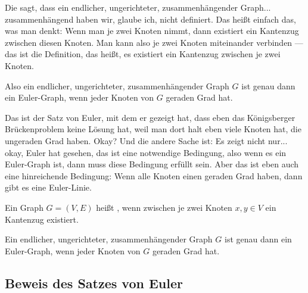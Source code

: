 \begin{spoken-clean}[00:04:10 - 00:06:20]
Die sagt, dass ein endlicher, ungerichteter, zusammenhängender Graph... zusammenhängend haben wir, glaube ich, nicht definiert. Das heißt einfach das, was man denkt: Wenn man je zwei Knoten nimmt, dann existiert ein Kantenzug zwischen diesen Knoten. Man kann also je zwei Knoten miteinander verbinden --- das ist die Definition, das heißt, es existiert ein Kantenzug zwischen je zwei Knoten. 

Also ein endlicher, ungerichteter, zusammenhängender Graph $G$ ist genau dann ein Euler-Graph, wenn jeder Knoten von $G$ geraden Grad hat. 

Das ist der Satz von Euler, mit dem er gezeigt hat, dass eben das Königsberger Brückenproblem keine Lösung hat, weil man dort halt eben viele Knoten hat, die ungeraden Grad haben. Okay? Und die andere Sache ist: Es zeigt nicht nur... okay, Euler hat gesehen, das ist eine notwendige Bedingung, also wenn es ein Euler-Graph ist, dann muss diese Bedingung erfüllt sein. Aber das ist eben auch eine hinreichende Bedingung: Wenn alle Knoten einen geraden Grad haben, dann gibt es eine Euler-Linie.
\end{spoken-clean}

\begin{math-stroke}
\begin{definition}\label{def:zusammenhaengend}
Ein Graph $G = (V, E)$ heißt , wenn zwischen je zwei Knoten $x, y \in V$ ein Kantenzug existiert.
\end{definition}

\begin{proposition}\label{prop:satz-von-euler}
Ein endlicher, ungerichteter, zusammenhängender Graph $G$ ist genau dann ein Euler-Graph, wenn jeder Knoten von $G$ geraden Grad hat.
\end{proposition}
\end{math-stroke}

\subsection{Beweis des Satzes von Euler}

